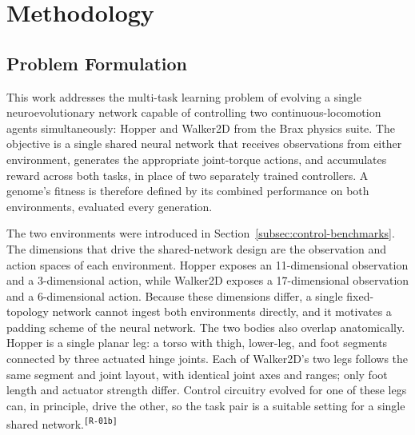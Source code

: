 \documentclass[12pt]{article}
\newcommand{\cohID}[1]{\textsuperscript{\scriptsize\texttt{[#1]}}}
\newcommand{\cohRepeat}[2]{\textcolor{cohRepeat}{#2}\cohID{#1}}
\begin{document}


\section{Methodology}
\label{sec:methodology}

\subsection{Problem Formulation}
\label{subsec:problem-formulation}

This work addresses the multi-task learning problem of evolving a single neuroevolutionary network capable of controlling two continuous-locomotion agents simultaneously: Hopper and Walker2D from the Brax physics suite.
The objective is a single shared neural network that receives observations from either environment, generates the appropriate joint-torque actions, and accumulates reward across both tasks, in place of two separately trained controllers.
A genome's fitness is therefore defined by its combined performance on both environments, evaluated every generation.

The two environments were introduced in Section~\ref{subsec:control-benchmarks}. The dimensions that drive the shared-network design are the observation and action spaces of each environment.
Hopper exposes an 11-dimensional observation and a 3-dimensional action, while Walker2D exposes a 17-dimensional observation and a 6-dimensional action.
Because these dimensions differ, a single fixed-topology network cannot ingest both environments directly, and it motivates a padding scheme of the neural network.
The two bodies also overlap anatomically.
Hopper is a single planar leg: a torso with thigh, lower-leg, and foot segments connected by three actuated hinge joints.
\cohRepeat{R-01b}{Each of Walker2D's two legs follows the same segment and joint layout, with identical joint axes and ranges; only foot length and actuator strength differ.
Control circuitry evolved for one of these legs can, in principle, drive the other, so the task pair is a suitable setting for a single shared network.}
\end{document}
